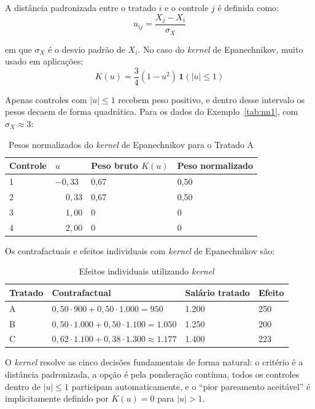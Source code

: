 \documentclass[12pt,a4paper]{article}
\begin{document}
A distância padronizada entre o tratado $i$ e o controle $j$ é definida como:
$$u_{ij} = \frac{X_j - X_i}{\sigma_X}$$

em que $\sigma_X$ é o desvio padrão de $X_i$. No caso do \textit{kernel} de Epanechnikov, muito usado em aplicações:
$$K(u) = \frac{3}{4}(1 - u^2)\,\mathbf{1}(|u|\leq 1)$$

Apenas controles com $|u| \leq 1$ recebem peso positivo, e dentro desse intervalo os pesos decaem de forma quadrática. Para os dados do Exemplo~\ref{tab:nn1}, com $\sigma_X \approx 3$:

\begin{table}[H]
\centering
\caption{Pesos normalizados do \textit{kernel} de Epanechnikov para o Tratado A}\label{tab:kernel_a}
\begin{tabular}{llll}
\toprule
Controle & $u$ & Peso bruto $K(u)$ & Peso normalizado \\
\midrule
1 & $-0{,}33$ & 0,67 & 0,50 \\
2 & $\phantom{-}0{,}33$ & 0,67 & 0,50 \\
3 & $\phantom{-}1{,}00$ & 0 & 0 \\
4 & $\phantom{-}2{,}00$ & 0 & 0 \\
\bottomrule
\end{tabular}
\end{table}

Os contrafactuais e efeitos individuais com \textit{kernel} de Epanechnikov são:

\begin{table}[H]
\centering
\caption{Efeitos individuais utilizando \textit{kernel}}\label{tab:kernel_ef}
\begin{tabular}{llll}
\toprule
Tratado & Contrafactual & Salário tratado & Efeito \\
\midrule
A & $0{,}50 \cdot 900 + 0{,}50 \cdot 1.000 = 950$ & 1.200 & 250 \\
B & $0{,}50 \cdot 1.000 + 0{,}50 \cdot 1.100 = 1.050$ & 1.250 & 200 \\
C & $0{,}62 \cdot 1.100 + 0{,}38 \cdot 1.300 \approx 1.177$ & 1.400 & 223 \\
\bottomrule
\end{tabular}
\end{table}

O \textit{kernel} resolve as cinco decisões fundamentais de forma natural: o critério é a distância padronizada, a opção é pela ponderação contínua, todos os controles dentro de $|u| \leq 1$ participam automaticamente, e o ``pior pareamento aceitável'' é implicitamente definido por $K(u) = 0$ para $|u| > 1$.
\end{document}
